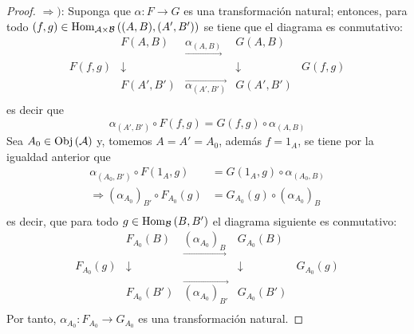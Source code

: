 \documentclass[12pt]{report}
\theoremstyle{largebreak}
\newcommand\cf[3]{\ensuremath{#1:#2\rightarrow#3}}
\newcommand{\Obj}[1]{\ensuremath{\textup{Obj}\left(#1\right)}}
\newcommand{\Hom}[3]{\ensuremath{\textup{Hom}_{#1}\left(#2,#3\right)}}
\begin{document}
    \begin{proof}
        $\Rightarrow)$: Suponga que $\cf{\alpha}{F}{G}$ es una transformación natural; entonces, para todo $(f,g)\in\Hom{\mathcal{A}\times\mathcal{B}}{(A,B)}{(A',B')}$ se tiene que el diagrama es conmutativo:
        \begin{equation}
            \begin{array}{rcccl}
                &F(A,B) & \underset{\longrightarrow}{\alpha_{(A,B)}} & G(A,B) &\\
                F(f,g) & \downarrow & & \downarrow & G(f,g) \\
                &F(A',B') & \overset{\longrightarrow}{\alpha_{ (A',B')}} & G(A',B') &\\
            \end{array}
        \end{equation}
        es decir que
        \begin{equation*}
            \alpha_{(A',B')}\circ F(f,g)=G(f,g)\circ\alpha_{(A,B)}
        \end{equation*}
        Sea $A_0\in\Obj{\mathcal{A}}$ y, tomemos $A=A'=A_0$, además $f=1_A$, se tiene por la igualdad anterior que
        \begin{equation*}
            \begin{split}
                \alpha_{(A_0,B')}\circ F(1_A,g)&=G(1_A,g)\circ\alpha_{(A_0,B)}\\
                \Rightarrow (\alpha_{A_0})_{B'}\circ F_{A_0}(g)&=G_{A_0}(g)\circ (\alpha_{A_0})_B\\
            \end{split}
        \end{equation*}
        es decir, que para todo $g\in\Hom{\mathcal{B}}{B}{B'}$ el diagrama siguiente es conmutativo:
        \begin{equation*}
            \begin{array}{rcccl}
                &F_{A_0}(B) & \underset{\longrightarrow}{(\alpha_{A_0})_{B}} & G_{A_0}(B) &\\
                F_{A_0}(g) & \downarrow & & \downarrow & G_{A_0}(g) \\
                &F_{A_0}(B') & \overset{\longrightarrow}{(\alpha_{A_0})_{B'}} & G_{A_0}(B') &\\
            \end{array}
        \end{equation*}
        Por tanto, $\cf{\alpha_{A_0}}{F_{A_0}}{G_{A_0}}$ es una transformación natural.


\end{proof}
\end{document}
